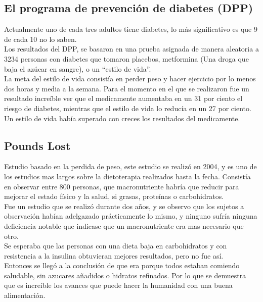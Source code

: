 \subsection{El programa de prevención de diabetes (DPP)\cite{DPP}}
Actualmente uno de cada tres adultos tiene diabetes, lo más significativo es que 9 de cada 10 no lo saben. \\

Los resultados del DPP, se basaron en una prueba asignada de manera aleatoria a 3234 personas con diabetes que tomaron placebos,  metformina (Una droga que baja el azúcar en sangre), o un “estilo de vida”.\\

La meta del estilo de vida consistía en perder peso y hacer ejercicio por lo menos dos horas y media a la semana.
Para el momento en el que se realizaron fue un resultado increíble ver que el medicamente aumentaba en un 31 por ciento el riesgo de diabetes, mientras que el estilo de vida lo reducía en un 27 por ciento. Un estilo de vida había superado con creces los resultados del medicamente. \\

\subsection{Pounds Lost}
Estudio basado en la perdida de peso, este estudio se realizó en 2004, y es uno de los estudios mas largos sobre la dietoterapia realizados hasta la fecha. Consistía en observar entre 800 personas, que macronutriente habría que reducir para mejorar el estado físico y la salud, si grasas, proteínas o carbohidratos.\\

Fue un estudio que se realizó durante dos años, y se observo que los sujetos a observación habían adelgazado prácticamente lo mismo, y ninguno sufría ninguna deficiencia notable que indicase que un macronutriente era mas necesario que otro.\\

Se esperaba que las personas con una dieta baja en carbohidratos y con resistencia a la insulina obtuvieran mejores resultados, pero no fue así.\\
Entonces se llegó a la conclusión de que era porque todos estaban comiendo saludable, sin azucares añadidos o hidratos refinados. Por lo que se demuestra que es increíble los avances que puede hacer la humanidad con una buena alimentación.
